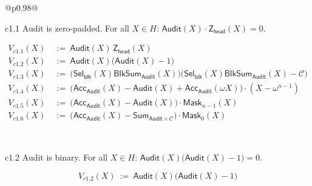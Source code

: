 


\begin{table}[t]
\small
\setlength{\tabcolsep}{3pt}
\renewcommand{\arraystretch}{1.05}
\caption{Audit column constraints (c1.*).}
\label{tab:constraints-audit}
\begin{tabular}{@{}p{0.98\linewidth}@{}}
\toprule

c1.1 Audit is zero-padded. For all $X\in H$: $\mathsf{Audit}(X)\cdot \mathsf{Z}_{\mathsf{head}}(X)=0$.
\begin{mdframed}[linewidth=0.6pt,backgroundcolor=verylightpink,innerleftmargin=6pt,innerrightmargin=6pt,innertopmargin=4pt,innerbottommargin=4pt]
\[
\begin{aligned}
V_{c1.1}(X)\ &:=\ \mathsf{Audit}(X)\,\mathsf{Z}_{\mathsf{head}}(X)\\
V_{c1.2}(X)\ &:=\ \mathsf{Audit}(X)\bigl(\mathsf{Audit}(X)-1\bigr) \\
V_{c1.3}(X)\ &:=\ \bigl(\mathsf{Sel}_{\mathsf{blk}}(X)\mathsf{BlkSum}_{\mathsf{Audit}}(X)\bigr)\bigl(\mathsf{Sel}_{\mathsf{blk}}(X)\mathsf{BlkSum}_{\mathsf{Audit}}(X)-\mathcal{C}\bigr) \\
V_{c1.4}(X)\ &:=\ \bigl(\mathsf{Acc}_{\mathsf{Audit}}(X)-\mathsf{Audit}(X)+\mathsf{Acc}_{\mathsf{Audit}}(\omega X)\bigr)\cdot(X-\omega^{n-1})\\
V_{c1.5}(X)\ &:=\ \bigl(\mathsf{Acc}_{\mathsf{Audit}}(X)-\mathsf{Audit}(X)\bigr)\cdot \mathsf{Mask}_{n-1}(X)\\
V_{c1.6}(X)\ &:=\ \bigl(\mathsf{Acc}_{\mathsf{Audit}}(X)-\mathsf{Sum}_{\mathsf{Audit}\times\mathcal{C}}\bigr)\cdot \mathsf{Mask}_{0}(X)
\end{aligned}
\]

\end{mdframed}
\\[-2mm]
\midrule

c1.2 Audit is binary. For all $X\in H$: $\mathsf{Audit}(X)\bigl(\mathsf{Audit}(X)-1\bigr)=0$.
\begin{mdframed}[linewidth=0.6pt,backgroundcolor=verylightpink,innerleftmargin=6pt,innerrightmargin=6pt,innertopmargin=4pt,innerbottommargin=4pt]
\[
V_{c1.2}(X)\ :=\ \mathsf{Audit}(X)\bigl(\mathsf{Audit}(X)-1\bigr)
\]
\end{mdframed}
\\[-2mm]
\midrule


\end{tabular}
\end{table}
